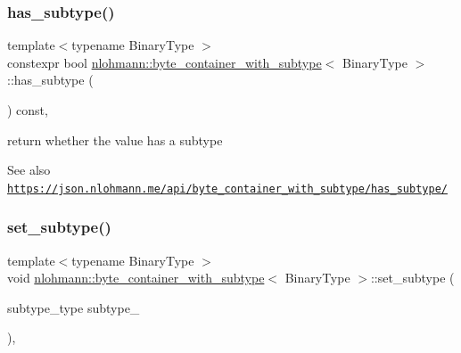 \subsubsection{\texorpdfstring{has\+\_\+subtype()}{has\_subtype()}}
{\footnotesize\ttfamily template$<$typename Binary\+Type $>$ \\
constexpr bool \hyperlink{classnlohmann_1_1byte__container__with__subtype}{nlohmann\+::byte\+\_\+container\+\_\+with\+\_\+subtype}$<$ Binary\+Type $>$\+::has\+\_\+subtype (\begin{DoxyParamCaption}{ }\end{DoxyParamCaption}) const\hspace{0.3cm}{\ttfamily [inline]}, {\ttfamily [noexcept]}}



return whether the value has a subtype 

\begin{DoxySeeAlso}{See also}
\href{https://json.nlohmann.me/api/byte_container_with_subtype/has_subtype/}{\tt https\+://json.\+nlohmann.\+me/api/byte\+\_\+container\+\_\+with\+\_\+subtype/has\+\_\+subtype/} 
\end{DoxySeeAlso}
\mbox{\label{classnlohmann_1_1byte__container__with__subtype_aa8f9fca70673949d7483a6097d00d61c}} 
\subsubsection{\texorpdfstring{set\+\_\+subtype()}{set\_subtype()}}
{\footnotesize\ttfamily template$<$typename Binary\+Type $>$ \\
void \hyperlink{classnlohmann_1_1byte__container__with__subtype}{nlohmann\+::byte\+\_\+container\+\_\+with\+\_\+subtype}$<$ Binary\+Type $>$\+::set\+\_\+subtype (\begin{DoxyParamCaption}\item[{subtype\+\_\+type}]{subtype\+\_\+ }\end{DoxyParamCaption})\hspace{0.3cm}{\ttfamily [inline]}, {\ttfamily [noexcept]}}



